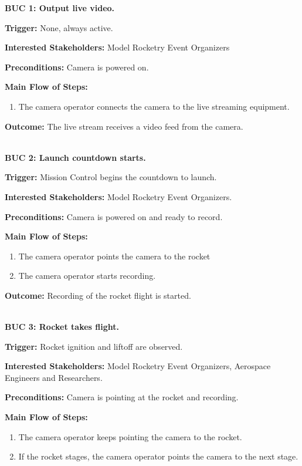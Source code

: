 \documentclass[12pt]{article}
\begin{document}
\textbf{BUC 1: Output live video.}

\textbf{Trigger:} None, always active.

\textbf{Interested Stakeholders:} Model Rocketry Event Organizers

\textbf{Preconditions:} Camera is powered on.

\textbf{Main Flow of Steps:}
\begin{enumerate}
  \item The camera operator connects the camera to the live streaming equipment.
\end{enumerate}

\textbf{Outcome:} The live stream receives a video feed from the camera.

~\\

\textbf{BUC 2: Launch countdown starts.}

\textbf{Trigger:} Mission Control begins the countdown to launch.

\textbf{Interested Stakeholders:} Model Rocketry Event Organizers.

\textbf{Preconditions:} Camera is powered on and ready to record.

\textbf{Main Flow of Steps:}
\begin{enumerate}
  \item The camera operator points the camera to the rocket
  \item The camera operator starts recording.
\end{enumerate}

\textbf{Outcome:} Recording of the rocket flight is started.

~\\

\textbf{BUC 3: Rocket takes flight.}

\textbf{Trigger:} Rocket ignition and liftoff are observed.

\textbf{Interested Stakeholders:} Model Rocketry Event Organizers, Aerospace Engineers and Researchers.

\textbf{Preconditions:} Camera is pointing at the rocket and recording.

\textbf{Main Flow of Steps:}
\begin{enumerate}
  \item The camera operator keeps pointing the camera to the rocket.
  \item If the rocket stages, the camera operator points the camera to the next stage.
\end{enumerate}
\end{document}
